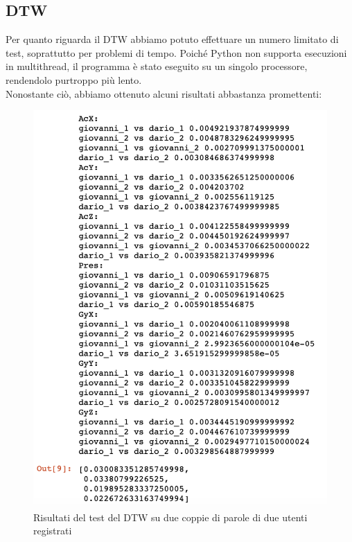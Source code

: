 \documentclass[8pt,notitlepage]{report}
\begin{document}
		\subsection{DTW}
			Per quanto riguarda il DTW abbiamo potuto effettuare un numero limitato di test, soprattutto per problemi di tempo. Poiché Python non supporta esecuzioni in multithread, il programma è stato eseguito su un singolo processore, rendendolo purtroppo più lento. \\
			Nonostante ciò, abbiamo ottenuto alcuni risultati abbastanza promettenti:
				\begin{figure}[H]
					\begin{center}
						\includegraphics[scale=.25]{dtw_test}
						\caption{Risultati del test del DTW su due coppie di parole di due utenti registrati}
					\end{center}
				\end{figure}	
				
\end{document}
